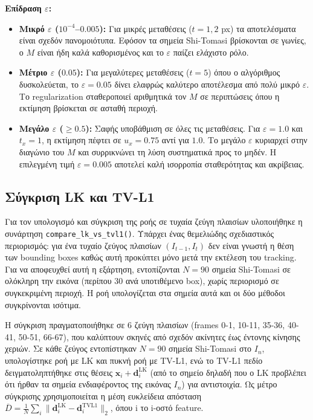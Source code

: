 \documentclass[12pt]{article}
\begin{document}
\textbf{Επίδραση $\varepsilon$:}
\begin{itemize}
    \item \textbf{Μικρό $\varepsilon$ ($10^{-4}$--$0.005$):} Για μικρές μεταθέσεις ($t=1,2$ px) τα αποτελέσματα είναι σχεδόν πανομοιότυπα. Eφόσον τα σημεία Shi-Tomasi βρίσκονται σε γωνίες, ο $M$ είναι ήδη καλά καθορισμένος και το $\varepsilon$ παίζει ελάχιστο ρόλο.

    \item \textbf{Μέτριο $\varepsilon$ ($0.05$):} Για μεγαλύτερες μεταθέσεις ($t=5$) όπου ο αλγόριθμος δυσκολεύεται, το $\varepsilon=0.05$ δίνει ελαφρώς καλύτερο αποτέλεσμα από πολύ μικρό $\varepsilon$. Tο regularization σταθεροποιεί αριθμητικά τον $M$ σε περιπτώσεις όπου η εκτίμηση βρίσκεται σε ασταθή περιοχή.

    \item \textbf{Μεγάλο $\varepsilon$ ($\geq 0.5$):} Σαφής υποβάθμιση σε όλες τις μεταθέσεις. Για $\varepsilon=1.0$ και $t_x=1$, η εκτίμηση πέφτει σε $u_x=0.75$ αντί για $1.0$. Tο μεγάλο $\varepsilon$ κυριαρχεί στην διαγώνιο του $M$ και συρρικνώνει τη λύση συστηματικά προς το μηδέν. Η επιλεγμένη τιμή $\varepsilon=0.005$ αποτελεί καλή ισορροπία σταθερότητας και ακρίβειας.
\end{itemize}

\subsection*{Σύγκριση LK και TV-L1}

\hspace{0.6cm}Για τον υπολογισμό και σύγκριση της ροής σε τυχαία ζεύγη πλαισίων υλοποιήθηκε η συνάρτηση \texttt{compare\_lk\_vs\_tvl1()}. Υπάρχει ένας θεμελιώδης σχεδιαστικός περιορισμός: για ένα τυχαίο ζεύγος πλαισίων $(I_{t-1}, I_{t})$ δεν είναι γνωστή η θέση των bounding boxes καθώς αυτή προκύπτει μόνο μετά την εκτέλεση του tracking. Για να αποφευχθεί αυτή η εξάρτηση, εντοπίζονται $N=90$ σημεία Shi-Tomasi σε ολόκληρη την εικόνα (περίπου 30 ανά υποτιθέμενο box), χωρίς περιορισμό σε συγκεκριμένη περιοχή. Η ροή υπολογίζεται στα σημεία αυτά και οι δύο μέθοδοι συγκρίνονται ισότιμα.

\hspace{0.6cm}Η σύγκριση πραγματοποιήθηκε σε 6 ζεύγη πλαισίων (frames 0-1, 10-11, 35-36, 40-41, 50-51, 66-67), που καλύπτουν σκηνές από σχεδόν ακίνητες έως έντονης κίνησης χεριών. Σε κάθε ζεύγος εντοπίστηκαν $N=90$ σημεία Shi-Tomasi στο $I_n$, υπολογίστηκε ροή με LK και πυκνή ροή με TV-L1, ενώ το TV-L1 πεδίο δειγματοληπτήθηκε στις θέσεις $\mathbf{x}_i + \mathbf{d}_i^{\text{LK}}$ (από το σημείο δηλαδή που ο LK προβλέπει ότι ήρθαν τα σημεία ενδιαφέροντος της εικόνας $I_{n}$) για αντιστοιχία. Ως μέτρο σύγκρισης χρησιμοποιείται η μέση ευκλείδεια απόσταση $\overline{D} = \frac{1}{N}\sum_i \|\mathbf{d}_i^{\text{LK}} - \mathbf{d}_i^{\text{TVL1}}\|_2$, όπου i το i-οστό feature.
\end{document}
